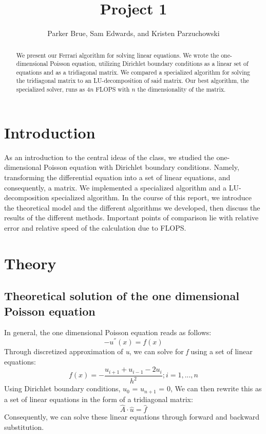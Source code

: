 \documentclass[10pt,showpacs,preprintnumbers,footinbib,amsmath,amssymb,aps,prl,twocolumn,groupedaddress,superscriptaddress,showkeys]{revtex4-1}
\begin{document}
\title{Project 1}
\author{Parker Brue, Sam Edwards, and Kristen Parzuchowski}
\begin{abstract}
We present our Ferrari algorithm for solving linear equations. We wrote the one-dimensional Poisson equation, utilizing Dirichlet boundary conditions as a linear set of equations and as a tridiagonal matrix. We compared a specialized algorithm for solving the tridiagonal matrix to an LU-decomposition of said matrix.  Our best algorithm, the specialized solver, runs as $4n$ FLOPS with $n$ the dimensionality of the matrix.
\end{abstract}
\maketitle
\begin{widetext}
\tableofcontents
\end{widetext}
\section{Introduction}
As an introduction to the central ideas of the class, we studied the one-dimensional Poisson equation with Dirichlet boundary conditions. Namely, transforming the differential equation into a set of linear equations, and consequently, a matrix. We implemented a specialized algorithm and a LU-decomposition specialized algorithm. In the course of this report, we introduce the theoretical model and the different algorithms  we developed, then discuss the results of the different methods. Important points of comparison lie with relative error and relative speed of the calculation due to FLOPS. 

\section{Theory}
	\subsection{Theoretical solution of the one dimensional Poisson equation}	
In general, the one dimensional Poisson equation reads as follows: \begin{equation} -u^{''}(x) = f(x)    \end{equation}  Through discretized approximation of {\it u}, we can solve for {\it f} using a set of linear equations: \begin{equation}\label{eq:b}
	f(x)=-\frac{u_{i+1}+u_{i-1}-2u_{i}}{h^{2}}      ;      i=1,...,n
	\end{equation}
Using Dirichlet boundary conditions, $u_{0}$  = $u_{n+1}$ = 0,  We can then rewrite this as a set of linear equations in the form of a tridiagonal matrix: \begin{equation}	
	\hat{A} \cdot \hat{u} = \hat{f}
	\end{equation}
Consequently, we can solve these linear equations through forward and backward substitution.
\end{document}
